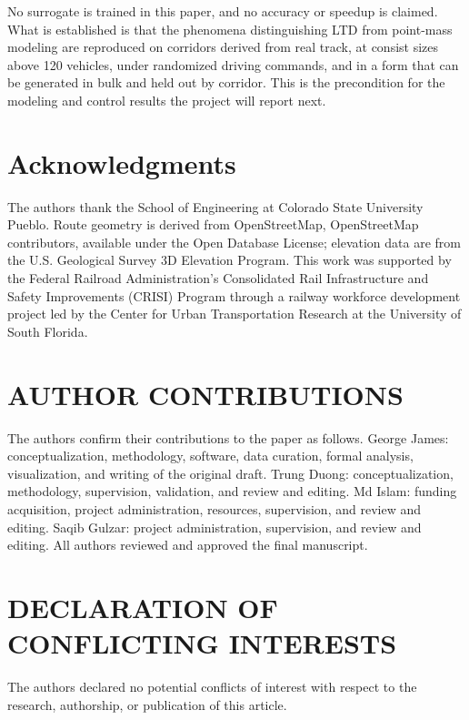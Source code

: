 \documentclass[numbered]{trbunofficial}
\begin{document}
No surrogate is trained in this paper, and no accuracy or speedup is claimed. What is established is that the phenomena distinguishing LTD from point-mass modeling are reproduced on corridors derived from real track, at consist sizes above 120 vehicles, under randomized driving commands, and in a form that can be generated in bulk and held out by corridor. This is the precondition for the modeling and control results the project will report next.

\section{Acknowledgments}

The authors thank the School of Engineering at Colorado State University Pueblo. Route geometry is derived from OpenStreetMap, \textcopyright{} OpenStreetMap contributors, available under the Open Database License; elevation data are from the U.S. Geological Survey 3D Elevation Program. This work was supported by the Federal Railroad Administration's Consolidated Rail Infrastructure and Safety Improvements (CRISI) Program through a railway workforce development project led by the Center for Urban Transportation Research at the University of South Florida.

\section*{AUTHOR CONTRIBUTIONS}
The authors confirm their contributions to the paper as follows. George James: conceptualization, methodology, software, data curation, formal analysis, visualization, and writing of the original draft. Trung Duong: conceptualization, methodology, supervision, validation, and review and editing. Md Islam: funding acquisition, project administration, resources, supervision, and review and editing. Saqib Gulzar: project administration, supervision, and review and editing. All authors reviewed and approved the final manuscript.

\section*{DECLARATION OF CONFLICTING INTERESTS}
The authors declared no potential conflicts of interest with respect to the research, authorship, or publication of this article.



\end{document}
